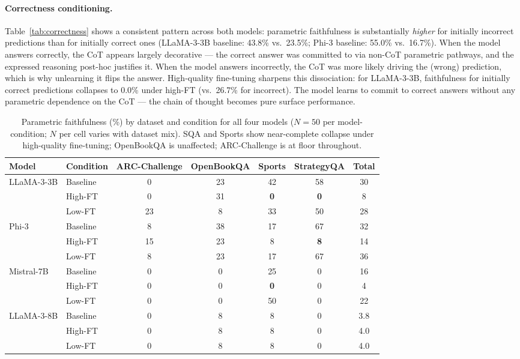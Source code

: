 \documentclass[11pt]{article}
\begin{document}
\paragraph{Correctness conditioning.}
Table~\ref{tab:correctness} shows a consistent pattern across both
models: parametric faithfulness is substantially \textit{higher}
for initially incorrect predictions than for initially correct ones
(LLaMA-3-3B baseline: 43.8\% vs.\ 23.5\%; Phi-3 baseline: 55.0\%
vs.\ 16.7\%). When the model answers correctly, the CoT appears
largely decorative --- the correct answer was committed to via
non-CoT parametric pathways, and the expressed reasoning post-hoc
justifies it. When the model answers incorrectly, the CoT was more
likely driving the (wrong) prediction, which is why unlearning it
flips the answer.  High-quality fine-tuning sharpens this
dissociation: for LLaMA-3-3B, faithfulness for initially correct
predictions collapses to 0.0\% under high-FT (vs.\ 26.7\% for
incorrect). The model learns to commit to correct answers without
any parametric dependence on the CoT --- the chain of thought
becomes pure surface performance.

\begin{table}[t]
\centering
\small
\caption{Parametric faithfulness (\%) by dataset and condition for
all four models ($N=50$ per model-condition; $N$ per cell varies
with dataset mix). SQA and Sports show near-complete collapse
under high-quality fine-tuning; OpenBookQA is unaffected;
ARC-Challenge is at floor throughout.}
\label{tab:dataset}
\begin{tabular}{llccccc}
\toprule
Model & Condition & ARC-Challenge & OpenBookQA & Sports & StrategyQA & Total \\
\midrule
\multirow{3}{*}{LLaMA-3-3B}
 & Baseline & 0  & 23 & 42 & 58 & 30 \\
 & High-FT  & 0  & 31 & \textbf{0}  & \textbf{0}  & 8  \\
 & Low-FT   & 23 & 8  & 33 & 50 & 28 \\
\midrule
\multirow{3}{*}{Phi-3}
 & Baseline & 8  & 38 & 17 & 67 & 32 \\
 & High-FT  & 15 & 23 & 8  & \textbf{8}  & 14 \\
 & Low-FT   & 8  & 23 & 17 & 67 & 36 \\
\midrule
\multirow{3}{*}{Mistral-7B}
 & Baseline & 0  & 0  & 25 & 0  & 16 \\
 & High-FT  & 0  & 0  & \textbf{0}  & 0  & 4  \\
 & Low-FT   & 0  & 0  & 50 & 0  & 22 \\
\midrule
\multirow{3}{*}{LLaMA-3-8B}
 & Baseline & 0  & 8  & 8  & 0  & 3.8 \\
 & High-FT  & 0  & 8  & 8  & 0  & 4.0 \\
 & Low-FT   & 0  & 8  & 8  & 0  & 4.0 \\
\bottomrule
\end{tabular}
\end{table}
\end{document}
